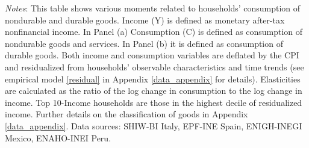 \documentclass[12pt]{article}
\begin{document}
\begin{spacing}{1.5}
\begin{table}[H]
\raggedright{}\textit{\footnotesize{}Notes}{\footnotesize{}: This table shows various moments related to households' consumption of nondurable and durable goods. Income (Y) is defined as monetary after-tax nonfinancial income. In Panel (a) Consumption (C) is defined as consumption of nondurable goods and services. In Panel (b) it is defined as consumption of durable goods. Both income and consumption variables are deflated by the CPI and residualized from households' observable characteristics and time trends (see empirical model \eqref{residual} in Appendix \ref{data_appendix} for details). Elasticities are calculated as the ratio of the log change in consumption to the log change in income. Top 10-Income households are those in the highest decile of residualized income. Further details on the classification of goods in Appendix \ref{data_appendix}. Data sources:  SHIW-BI Italy, EPF-INE Spain, ENIGH-INEGI Mexico, ENAHO-INEI Peru.}{\footnotesize\par}
\end{table}





\end{spacing}
\end{document}
